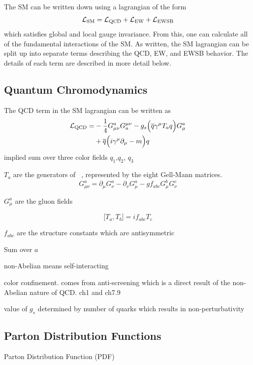 The SM can be written down using a lagrangian of the form
\begin{equation}
\mathcal{L}_{\textrm{SM}} = \mathcal{L}_{\textrm{QCD}} + \mathcal{L}_{\textrm{EW}} + \mathcal{L}_{\textrm{EWSB}}
\label{eq:lagrangian_sm}
\end{equation}
which satisfies global and local gauge invariance.
From this, one can calculate all of the fundamental interactions of the SM.
As written, the SM lagrangian can be split up into separate terms describing the
QCD, EW, and EWSB behavior. 
The details of each term are described in more detail below.


\subsection{Quantum Chromodynamics}
The QCD term in the SM lagrangian can be written as
\begin{equation}
\begin{aligned}
\mathcal{L}_{\textrm{QCD}} = &-\frac{1}{4}G^a_{\mu\nu} G_a^{\mu\nu} 
                         -g_s \Big( \overline{q} \gamma^{\mu} T_a q \Big) G_{\mu}^a \\
			 &+\overline{q}\Big( i\gamma^{\mu} \partial_{\mu} - m\Big) q
\end{aligned}
\label{eq:lagrangian_qcd}
\end{equation}
implied sum over three color fields $q_1$,$q_2$, $q_3$

$T_a$ are the generators of \suthree~, represented by the eight Gell-Mann matrices.
\begin{equation}
G_{\mu\nu}^a = \partial_{\mu} G^a_{\nu} - \partial_{\nu} G^a_{\mu} - g f_{abc} G_{\mu}^b G_{\nu}^c
\end{equation}

$G_{\mu}^a$ are the gluon fields

\begin{equation}
\Big[T_a,T_b\Big] = i f_{abc} T_c
\end{equation}

$f_{abc}$ are the structure constants which are antisymmetric

Sum over $a$

non-Abelian means self-interacting

color confinement. 
comes from anti-screening which is a direct result of the non-Abelian 
nature of QCD. ch1 and ch7.9


value of $g_s$ determined by number of quarks 
which results in non-perturbativity

\subsection{Parton Distribution Functions}
Parton Distribution Function (PDF)

